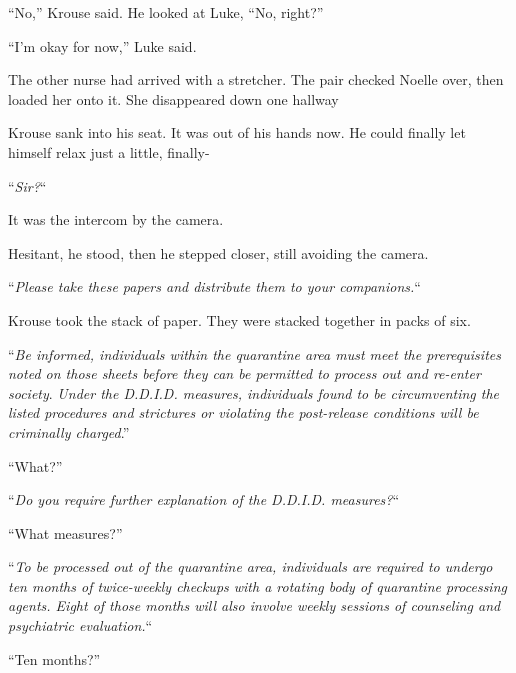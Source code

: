 ``No,'' Krouse said.  He looked at Luke, ``No, right?''



``I'm okay for now,'' Luke said.



The other nurse had arrived with a stretcher.  The pair checked Noelle over, then loaded her onto it.  She disappeared down one hallway



Krouse sank into his seat.  It was out of his hands now.  He could finally let himself relax just a little, finally-



``\emph{Sir?}``



It was the intercom by the camera.



Hesitant, he stood, then he stepped closer, still avoiding the camera.



``\emph{Please take these papers and distribute them to your companions.}``



Krouse took the stack of paper.  They were stacked together in packs of six.



``\emph{Be informed, individuals within the quarantine area must meet the prerequisites noted on those sheets before they can be permitted to process out and re-enter society}.  \emph{Under the D.D.I.D. measures, individuals found to be circumventing the listed procedures and strictures or violating the post-release conditions will be criminally charged}.''



``What?''



``\emph{Do you require further explanation of the D.D.I.D. measures?}``



``What measures?''



``\emph{To be processed out of the quarantine area, individuals are required to undergo ten months of twice-weekly checkups with a rotating body of quarantine processing agents.  Eight of those months will also involve weekly sessions of counseling and psychiatric evaluation.}``



``Ten months?''



